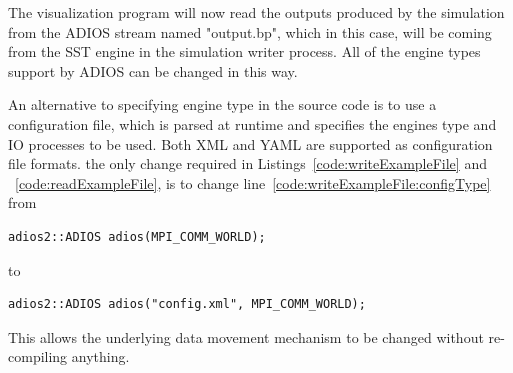 The visualization program will now read the outputs produced by the simulation from the ADIOS stream named "output.bp", which in this case, will be coming from the SST engine in the simulation writer process. All of the engine types support by ADIOS can be changed in this way.

An alternative to specifying engine type in the source code is to use a configuration file,  which is parsed at runtime and specifies the engines type and IO processes to be used. Both XML and YAML are supported as configuration file formats.
the only change required in Listings~\ref{code:writeExampleFile} and ~\ref{code:readExampleFile}, is to change line~\ref{code:writeExampleFile:configType}
from
\begin{lstlisting}[numbers=none]
adios2::ADIOS adios(MPI_COMM_WORLD);
\end{lstlisting}
to 
\begin{lstlisting}[numbers=none]
adios2::ADIOS adios("config.xml", MPI_COMM_WORLD);
\end{lstlisting}

This allows the underlying data movement mechanism to be changed without re-compiling anything.

%
%   

%
%
%  

